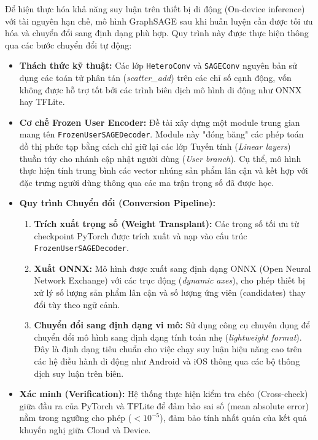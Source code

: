 Để hiện thực hóa khả năng suy luận trên thiết bị di động (On-device inference) với tài nguyên hạn chế, mô hình GraphSAGE sau khi huấn luyện cần được tối ưu hóa và chuyển đổi sang định dạng phù hợp. Quy trình này được thực hiện thông qua các bước chuyển đổi tự động:

\begin{itemize}
    \item \textbf{Thách thức kỹ thuật:} Các lớp \texttt{HeteroConv} và \texttt{SAGEConv} nguyên bản sử dụng các toán tử phân tán (\textit{scatter\_add}) trên các chỉ số cạnh động, vốn không được hỗ trợ tốt bởi các trình biên dịch mô hình di động như ONNX hay TFLite.
    
    \item \textbf{Cơ chế Frozen User Encoder:} Đề tài xây dựng một module trung gian mang tên \texttt{FrozenUserSAGEDecoder}. Module này "đóng băng" các phép toán đồ thị phức tạp bằng cách chỉ giữ lại các lớp Tuyến tính (\textit{Linear layers}) thuần túy cho nhánh cập nhật người dùng (\textit{User branch}). Cụ thể, mô hình thực hiện tính trung bình các vector nhúng sản phẩm lân cận và kết hợp với đặc trưng người dùng thông qua các ma trận trọng số đã được học.
    
    \item \textbf{Quy trình Chuyển đổi (Conversion Pipeline):}
    \begin{enumerate}
        \item \textbf{Trích xuất trọng số (Weight Transplant):} Các trọng số tối ưu từ checkpoint PyTorch được trích xuất và nạp vào cấu trúc \texttt{FrozenUserSAGEDecoder}.
        \item \textbf{Xuất ONNX:} Mô hình được xuất sang định dạng ONNX (Open Neural Network Exchange) với các trục động (\textit{dynamic axes}), cho phép thiết bị xử lý số lượng sản phẩm lân cận và số lượng ứng viên (candidates) thay đổi tùy theo ngữ cảnh.
        \item \textbf{Chuyển đổi sang định dạng vi mô:} Sử dụng công cụ chuyên dụng để chuyển đổi mô hình sang định dạng tính toán nhẹ (\textit{lightweight format}). Đây là định dạng tiêu chuẩn cho việc chạy suy luận hiệu năng cao trên các hệ điều hành di động như Android và iOS thông qua các bộ thông dịch suy luận trên biên.
    \end{enumerate}
    
    \item \textbf{Xác minh (Verification):} Hệ thống thực hiện kiểm tra chéo (Cross-check) giữa đầu ra của PyTorch và TFLite để đảm bảo sai số (mean absolute error) nằm trong ngưỡng cho phép ($< 10^{-5}$), đảm bảo tính nhất quán của kết quả khuyến nghị giữa Cloud và Device.
\end{itemize}

